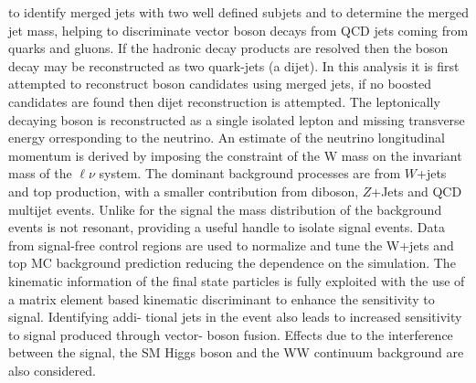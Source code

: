 to identify merged jets with two well defined subjets and to determine the merged jet mass,
helping to discriminate vector boson decays from QCD jets coming from quarks and gluons. If
the hadronic decay products are resolved then the boson decay may be reconstructed as two
quark-jets (a dijet). In this analysis it is first attempted to reconstruct boson candidates using
merged jets, if no boosted candidates are found then dijet reconstruction is attempted.
The leptonically decaying boson is reconstructed as a single isolated lepton and missing transverse energy
orresponding to the neutrino. An estimate of the neutrino longitudinal
momentum is derived by imposing the constraint of the W mass on the invariant mass of the $\ell \nu$ system.
The dominant background processes
are from $W$+jets and top production, with a smaller contribution from diboson, $Z$+Jets and
QCD multijet events. Unlike for the signal the mass distribution of the background events is
not resonant, providing a useful handle to isolate signal events. Data from signal-free control
regions are used to normalize and tune the W+jets and top MC background prediction reducing
the dependence on the simulation.
The kinematic information of the final state particles is fully exploited with the use of a matrix
element based kinematic discriminant to enhance the sensitivity to signal. Identifying addi-
tional jets in the event also leads to increased sensitivity to signal produced through vector-
boson fusion. Effects due to the interference between the signal, the SM Higgs boson and
the WW continuum background are also considered.

